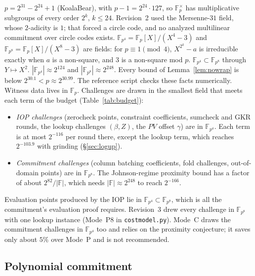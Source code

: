 \documentclass[11pt]{article}
\newcommand{\F}{\mathbb{F}}
\newcommand{\Fp}{\F_p}
\newcommand{\Fq}{\F_{p^4}}
\newcommand{\Fo}{\F_{p^8}}
\begin{document}
\(p = 2^{31} - 2^{24} + 1\) (KoalaBear), with \(p - 1 = 2^{24}\cdot 127\), so \(\Fp^\times\) has multiplicative subgroups of every order \(2^k\), \(k \le 24\).
Revision~2 used the Mersenne-\(31\) field, whose \(2\)-adicity is \(1\); that forced a circle code, and no analyzed multilinear commitment over circle codes exists.
\(\Fq = \Fp[X]/(X^4 - 3)\) and \(\Fo = \Fp[X]/(X^8 - 3)\) are fields: for \(p \equiv 1 \pmod 4\), \(X^{2^k} - a\) is irreducible exactly when \(a\) is a non-square, and \(3\) is a non-square mod \(p\).
\(\Fq \subset \Fo\) through \(Y \mapsto X^2\).
\(|\Fq| \approx 2^{124}\) and \(|\Fo| \approx 2^{248}\).
Every bound of Lemma~\ref{lem:nowrap} is below \(2^{30.1} < p \approx 2^{30.99}\).
The reference script checks these facts numerically.
Witness data lives in \(\Fp\).
Challenges are drawn in the smallest field that meets each term of the budget (Table~\ref{tab:budget}):
\begin{itemize}
\item \emph{IOP challenges} (zerocheck points, constraint coefficients, sumcheck and GKR rounds, the lookup challenges \((\beta, Z)\), the \(PV\) offset \(\gamma\)) are in \(\Fq\). Each term is at most \(2^{-116}\) per round there, except the lookup term, which reaches \(2^{-103.9}\) with grinding (\S\ref{sec:logup}).
\item \emph{Commitment challenges} (column batching coefficients, fold challenges, out-of-domain points) are in \(\Fo\). The Johnson-regime proximity bound has a factor of about \(2^{82}/|\F|\), which needs \(|\F| \approx 2^{248}\) to reach \(2^{-166}\).
\end{itemize}
Evaluation points produced by the IOP lie in \(\Fq \subset \Fo\), which is all the commitment's evaluation proof requires.
Revision~3 drew every challenge in \(\Fo\) with one lookup instance (Mode~P8 in \texttt{costmodel.py}).
Mode~C draws the commitment challenges in \(\Fq\) too and relies on the proximity conjecture; it saves only about \(5\%\) over Mode~P and is not recommended.

\subsection{Polynomial commitment}
\label{sec:pcs}
\end{document}
